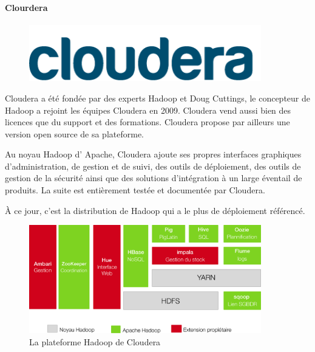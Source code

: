 \documentclass[12pt]{article}
\begin{document}
\paragraph{Clourdera}
\begin{figure}[H]
\centering
\includegraphics[width=0.9\textwidth]{clouderaLogo}
\end{figure}
Cloudera a été fondée par des experts Hadoop et Doug Cuttings, le concepteur de Hadoop a rejoint les équipes Cloudera en 2009. Cloudera vend aussi bien des licences que du support et des formations. Cloudera propose par ailleurs une version open source de sa plateforme.
\par
Au noyau Hadoop d’ Apache, Cloudera ajoute ses propres interfaces graphiques d'administration, de gestion et de suivi, des outils de déploiement, des outils de gestion de la sécurité ainsi que des solutions d’intégration à un large éventail de produits. La suite est entièrement testée et documentée par Cloudera.
\par
À ce jour, c'est la distribution de Hadoop qui a le plus de déploiement référencé.
\begin{figure}[H]
\centering
\includegraphics[width=0.9\textwidth]{cloudera}
\caption{La plateforme Hadoop de Cloudera}
\end{figure}
\end{document}
